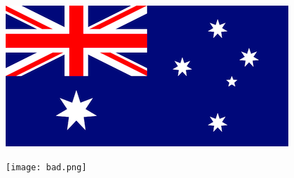 \documentclass{article}
\begin{document}
\includegraphics{good.png}

\texttt{[image: bad.png]}
\end{document}

